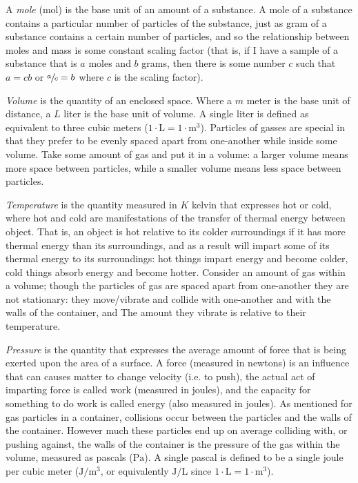\documentclass{article}
\begin{document}
\begin{definition*}
    A \emph{mole} (mol) is the base unit of an amount of a substance. A mole of a substance
    contains a particular number of particles of the substance, just as gram of a substance
    contains a certain number of particles, and so the relationship between moles and mass is
    some constant scaling factor (that is, if I have a sample of a substance that is $a$ moles
    and $b$ grams, then there is some number $c$ such that $a=cb$ or $\sfrac{a}{c}=b$ where $c$
    is the scaling factor).

    \emph{Volume} is the quantity of an enclosed space. Where a $m$ meter is the base unit of
    distance, a $L$ liter is the base unit of volume. A single liter is defined as equivalent to
    three cubic meters ($1\cdot\text{L}=1\cdot\text{m}^3$). Particles of gasses are special in
    that they prefer to be evenly spaced apart from one-another while inside some volume. Take
    some amount of gas and put it in a volume: a larger
    volume means more space between particles, while a smaller volume means less space between
    particles.

    \emph{Temperature} is the quantity measured in $K$ kelvin that expresses hot or cold, where hot
    and cold are manifestations of the transfer of thermal energy between object. That is, an object
    is hot relative to its colder surroundings if it has more thermal energy than its surroundings,
    and as a result will impart some of its thermal energy to its surroundings: hot things impart
    energy and become colder, cold things absorb energy and become hotter. Consider an amount of gas
    within a volume; though the particles of gas are spaced apart from one-another they are not
    stationary: they move/vibrate and collide with one-another and with the walls of the container,
    and The amount they vibrate is relative to their temperature.

    \emph{Pressure} is the quantity that expresses the average amount of force that is being
    exerted upon the area of a surface. A force (measured in newtons) is an influence that can
    causes matter to change velocity (i.e. to push), the actual act of imparting force is called
    work (measured in joules), and the capacity for something to do work is called energy (also
    measured in joules). As mentioned for gas particles in a container, collisions occur between
    the particles and the walls of the container. However much these particles end up on average
    colliding with, or pushing against, the walls of the container is the pressure of the gas
    within the volume, measured as pascals ($\text{Pa}$). A single pascal is defined to be a
    single joule per cubic meter ($\text{J}/\text{m}^3$, or equivalently $\text{J}/\text{L}$
    since $1\cdot\text{L}=1\cdot\text{m}^3$).
\end{definition*}
\end{document}
